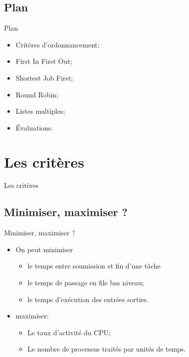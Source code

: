 \begin{frame}{\sectitle}
\def\subsectitle{Plan}
\subsection{\subsectitle}

\begin{block}{\subsectitle}
\begin{itemize}
    \item Critères d'ordonnancement;
    \item First In First Out;
    \item Shortest Job First;
    \item Round Robin;
    \item Listes multiples;
    \item Évaluations.
\end{itemize}
\end{block}

\end{frame}


\def\sectitle{Les critères}
\section{\sectitle}

\begin{frame}{\sectitle}

\def\subsectitle{Minimiser, maximiser ?}
\subsection{\subsectitle}
\begin{block}{\subsectitle}
\begin{itemize}
    \item On peut minimiser
    \begin{itemize}
        \item le temps entre soumission et fin d'une tâche
        \item le temps de passage en file bas niveau;
        \item le temps d'exécution des entrées sorties.
    \end{itemize}
    \item maximiser:
    \begin{itemize}
        \item Le taux d'activité du CPU;
        \item Le nombre de processus traités par unités de temps.
    \end{itemize}
\end{itemize}
\end{block}
\end{frame}

